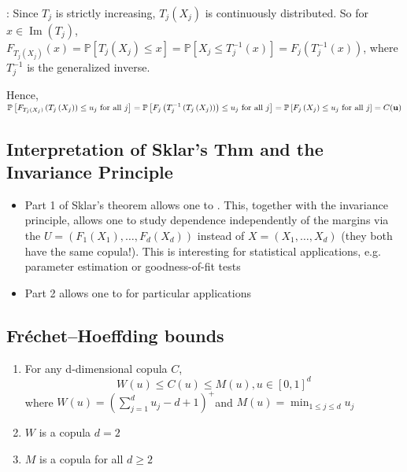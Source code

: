 : Since $T_{j}$ is strictly increasing, $T_{j}\left(X_{j}\right)$ is continuously distributed. So for $x \in \operatorname{Im}\left(T_{j}\right)$, $F_{T_{j}\left(X_{j}\right)}(x)=\mathbb{P}\left[T_{j}\left(X_{j}\right) \leq x\right]=\mathbb{P}\left[X_{j} \leq T_{j}^{-1}(x)\right]=F_{j}\left(T_{j}^{-1}(x)\right)$, where $T_{j}^{-1}$ is the generalized inverse. 

Hence,
$\mathbb{P}\left[F_{T_{j}\left(X_{j}\right)}\left(T_{j}\left(X_{j}\right)\right) \leq u_{j}\text{ for all } j\right]=\mathbb{P}\left[F_{j}\left(T_{j}^{-1}\left(T_{j}\left(X_{j}\right)\right)\right) \leq u_{j} \text{ for all } j\right]=\mathbb{P}\left[F_{j}\left(X_{j}\right) \leq u_{j}\text{ for all } j\right]=C(\operatorname{\boldsymbol{\mathbf{u}}})$





\subsection*{Interpretation of Sklar’s Thm and the Invariance Principle}
\begin{itemize}[leftmargin=*]
    \item Part 1 of Sklar's theorem allows one to . This, together with the invariance principle, allows one to study dependence independently of the margins via the  $U=\left(F_{1}\left(X_{1}\right), \ldots, F_{d}\left(X_{d}\right)\right)$ instead of $X=\left(X_{1}, \ldots, X_{d}\right)$ (they both have the same copula!). This is interesting for statistical applications, e.g. parameter estimation or goodness-of-fit tests
    \item Part 2 allows one to  for particular applications
\end{itemize}





\subsection*{Fréchet–Hoeffding bounds}
\begin{enumerate}[label = (\arabic*), leftmargin=*]
    \item For any d-dimensional copula $C$,
$$
W(u) \leq C(u) \leq M(u), u \in[0,1]^{d}
$$
where $W(u)=\left(\sum_{j=1}^{d} u_{j}-d+1\right)^{+}$and $M(u)=\min _{1 \leq j \leq d} u_{j}$
    \item $W$ is a copula  $d=2$
    \item $M$ is a copula for all $d \geq 2$
    
\end{enumerate}



